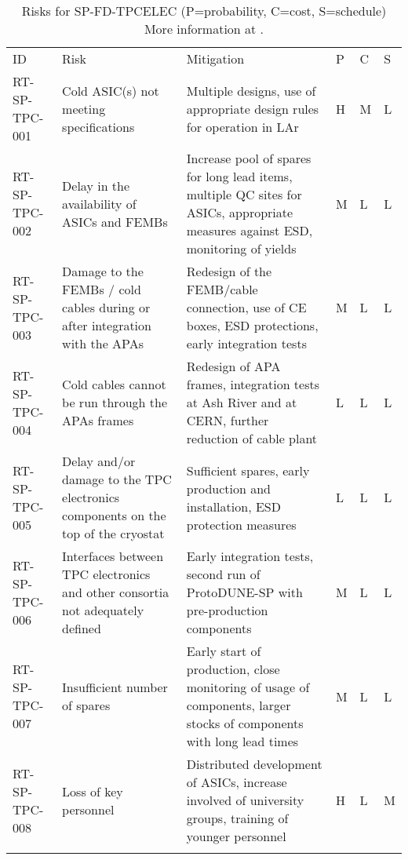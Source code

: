
\begin{footnotesize}
\begin{longtable}{P{0.18\textwidth}P{0.20\textwidth}P{0.32\textwidth}P{0.02\textwidth}P{0.02\textwidth}P{0.02\textwidth}} 
\caption[Risks for SP-FD-TPCELEC]{Risks for SP-FD-TPCELEC (P=probability, C=cost, S=schedule) More information at . } \\
ID & Risk & Mitigation & P & C & S  \\  \colhline
RT-SP-TPC-001 & Cold ASIC(s) not meeting specifications & Multiple designs, use of appropriate design rules for operation in LAr & H  & M & L \\  \colhline
RT-SP-TPC-002 & Delay in the availability of ASICs and FEMBs & Increase pool of spares for long lead items, multiple QC sites for ASICs, appropriate measures against ESD, monitoring of yields & M & L & L \\  \colhline
RT-SP-TPC-003 & Damage to the FEMBs / cold cables during or after integration with the APAs & Redesign of the FEMB/cable connection, use of CE boxes, ESD protections, early integration tests & M & L & L \\  \colhline
RT-SP-TPC-004 & Cold cables cannot be run through the APAs frames & Redesign of APA frames, integration tests at Ash River and at CERN, further reduction of cable plant & L & L & L \\  \colhline
RT-SP-TPC-005 & Delay and/or damage to the TPC electronics components on the top of the cryostat & Sufficient spares, early production and installation, ESD protection measures & L & L & L \\  \colhline
RT-SP-TPC-006 & Interfaces between TPC electronics and other consortia not adequately defined & Early integration tests, second run of ProtoDUNE-SP with pre-production components & M & L & L \\  \colhline
RT-SP-TPC-007 & Insufficient number of spares & Early start of production, close monitoring of usage of components, larger stocks of components with long lead times & M & L & L \\  \colhline
RT-SP-TPC-008 & Loss of key personnel & Distributed development of ASICs, increase involved of university groups, training of younger personnel & H & L & M \\  \colhline

\end{longtable}
\end{footnotesize}

